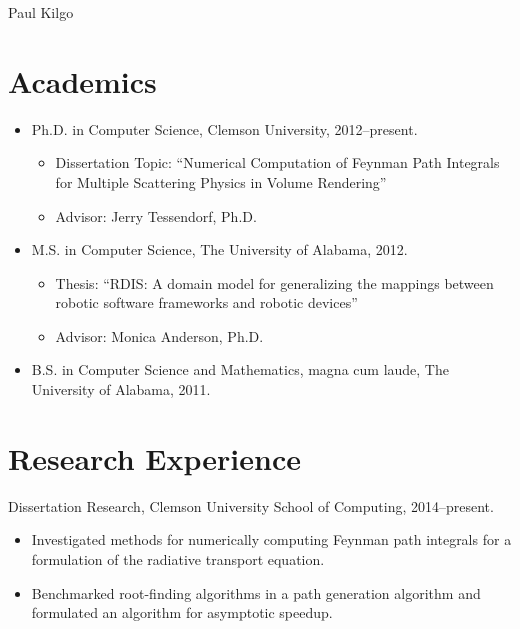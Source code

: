\documentclass[12pt,oldfontcommands]{memoir}
\begin{document}
\begin{center}
  \Huge{Paul Kilgo}
\end{center}
\thispagestyle{fancy}

\section*{Academics}

\begin{itemize}[leftmargin=*]
  \item Ph.D. in Computer Science, Clemson University, 2012--present.
  \begin{itemize}
    \item Dissertation Topic:
          ``Numerical Computation of Feynman Path Integrals for Multiple
            Scattering Physics in Volume Rendering''
    \item Advisor: Jerry Tessendorf, Ph.D.
  \end{itemize}

  \item M.S. in Computer Science, The University of Alabama, 2012.
  \begin{itemize}
    \item Thesis: ``RDIS: A domain model for generalizing the mappings between
                    robotic software frameworks and robotic devices''
    \item Advisor: Monica Anderson, Ph.D.
  \end{itemize}

  \item B.S. in Computer Science and Mathematics, magna cum laude, The
        University of Alabama, 2011.
\end{itemize}

\section*{Research Experience}

Dissertation Research, Clemson University School of Computing, 2014--present.

\begin{itemize}
  \item Investigated methods for numerically computing Feynman path integrals
        for a formulation of the radiative transport equation.
  \item Benchmarked root-finding algorithms in a path generation algorithm and
        formulated an algorithm for asymptotic speedup.
\end{itemize}
\end{document}
